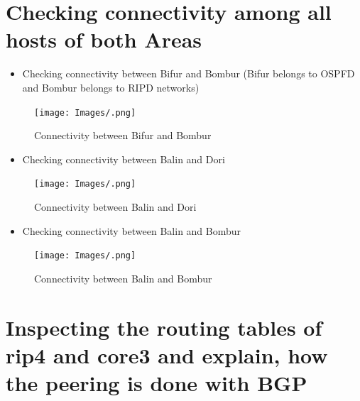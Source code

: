 \section{Checking connectivity among all hosts of both Areas}
\begin{itemize}
    \item Checking connectivity between Bifur and Bombur (Bifur belongs to OSPFD and Bombur belongs to RIPD networks)
\end{itemize}
\begin{figure}[H]
\centering
  \texttt{[image: Images/.png]}
  \caption{Connectivity between Bifur and Bombur  }
  \label{fig }
\end{figure}
\begin{itemize}
    \item Checking connectivity between Balin and Dori
\end{itemize}
\begin{figure}[H]
\centering
  \texttt{[image: Images/.png]}
  \caption{Connectivity between Balin and Dori  }
  \label{fig }
\end{figure}
\begin{itemize}
    \item Checking connectivity between Balin and Bombur
\end{itemize}
\begin{figure}[H]
\centering
  \texttt{[image: Images/.png]}
  \caption{Connectivity between Balin and Bombur  }
  \label{fig }
\end{figure}








\section{Inspecting the routing tables of rip4 and core3 and explain, how the peering is done with BGP}
